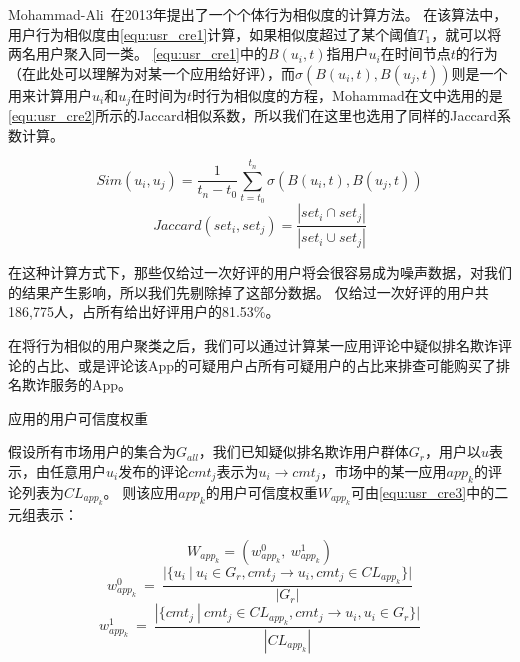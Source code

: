 Mohammad-Ali~\cite{abbasi2013measuring}在2013年提出了一个个体行为相似度的计算方法。
在该算法中，用户行为相似度由\autoref{equ:usr_cre1}计算，如果相似度超过了某个阈值$T_1$，就可以将两名用户聚入同一类。
\autoref{equ:usr_cre1}中的$B(u_i, t)$指用户$u_i$在时间节点$t$的行为（在此处可以理解为对某一个应用给好评），而$\sigma(B(u_i, t), B(u_j, t))$则是一个用来计算用户$u_i$和$u_j$在时间为$t$时行为相似度的方程，Mohammad在文中选用的是\autoref{equ:usr_cre2}所示的Jaccard相似系数，所以我们在这里也选用了同样的Jaccard系数计算。

\begin{equation}
Sim(u_i, u_j) = \frac{1}{t_n - t_0}\sum_{t=t_0}^{t_n}\sigma(B(u_i, t), B(u_j, t))
\label{equ:usr_cre1}
\end{equation}
\begin{equation}
Jaccard(set_i, set_j) = \frac{|set_i \cap set_j|}{|set_i \cup set_j|}
\label{equ:usr_cre2}
\end{equation}
\vspace{0.5mm}

在这种计算方式下，那些仅给过一次好评的用户将会很容易成为噪声数据，对我们的结果产生影响，所以我们先剔除掉了这部分数据。
仅给过一次好评的用户共186,775人，占所有给出好评用户的81.53\%。

在将行为相似的用户聚类之后，我们可以通过计算某一应用评论中疑似排名欺诈评论的占比、或是评论该App的可疑用户占所有可疑用户的占比来排查可能购买了排名欺诈服务的App。

\begin{Def}
	应用的用户可信度权重

	假设所有市场用户的集合为$G_{all}$，我们已知疑似排名欺诈用户群体$G_r$，用户以$u$表示，由任意用户$u_i$发布的评论$cmt_j$表示为$u_i \rightarrow cmt_j$，市场中的某一应用$app_k$的评论列表为$CL_{app_k}$。
	则该应用$app_k$的用户可信度权重$W_{app_k}$可由\autoref{equ:usr_cre3}中的二元组表示：
\end{Def}

\begin{equation}
	W_{app_k} = (w_{app_k}^0, ~w_{app_k}^1)
	\label{equ:usr_cre3}
\end{equation}
\begin{equation}
	w_{app_k}^0 ~ = ~ \frac{|\{u_i~|~u_i \in G_r, cmt_j \rightarrow u_i, cmt_j \in CL_{app_k}\}|}{|G_r|}
	\label{equ:usr_cre4}
\end{equation}
\begin{equation}
	w_{app_k}^1 ~ = ~ \frac{|\{cmt_j~|~cmt_j \in CL_{app_k}, cmt_j \rightarrow u_i, u_i \in G_r\}|}{|CL_{app_k}|}
	\label{equ:usr_cre5}
\end{equation}
\vspace{0.5mm}

